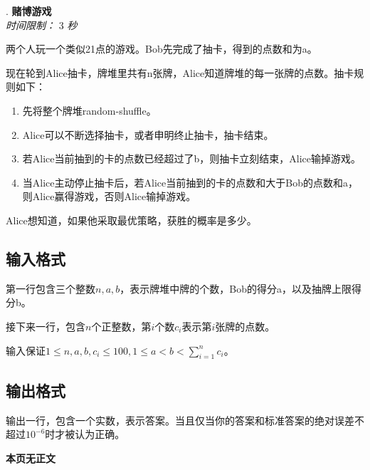\addtocounter{ProblemNo}{1}
\renewcommand{\ProblemName}{赌博游戏}
\begin{center}
\huge{. \textbf{\ProblemName}} \\ [0.8cm]
\large{\textit{时间限制：} 3 \textit{秒}} \\ [1cm]
\end{center}

两个人玩一个类似21点的游戏。Bob先完成了抽卡，得到的点数和为a。

现在轮到Alice抽卡，牌堆里共有n张牌，Alice知道牌堆的每一张牌的点数。抽卡规则如下：

\begin{enumerate}
\item 先将整个牌堆random-shuffle。
\item Alice可以不断选择抽卡，或者申明终止抽卡，抽卡结束。
\item 若Alice当前抽到的卡的点数已经超过了b，则抽卡立刻结束，Alice输掉游戏。
\item 当Alice主动停止抽卡后，若Alice当前抽到的卡的点数和大于Bob的点数和a，则Alice赢得游戏，否则Alice输掉游戏。
\end{enumerate}

Alice想知道，如果他采取最优策略，获胜的概率是多少。

\subsection*{输入格式}

第一行包含三个整数$n,a,b$，表示牌堆中牌的个数，Bob的得分a，以及抽牌上限得分b。

接下来一行，包含$n$个正整数，第$i$个数$c_i$表示第$i$张牌的点数。

输入保证$1 \leq n,a,b,c_i \leq 100, 1 \leq a < b < \sum_{i=1}^n c_i$。

\subsection*{输出格式}

输出一行，包含一个实数，表示答案。当且仅当你的答案和标准答案的绝对误差不超过$10^{-6}$时才被认为正确。

\setcounter{ExampleNo}{0}


\clearpage

\ifodd\value{page}
\else
    \vspace*{\fill}
    \begin{center}
    \textbf{\Large 本页无正文}
    \end{center}
    \vspace*{\fill}
    \clearpage
\fi


